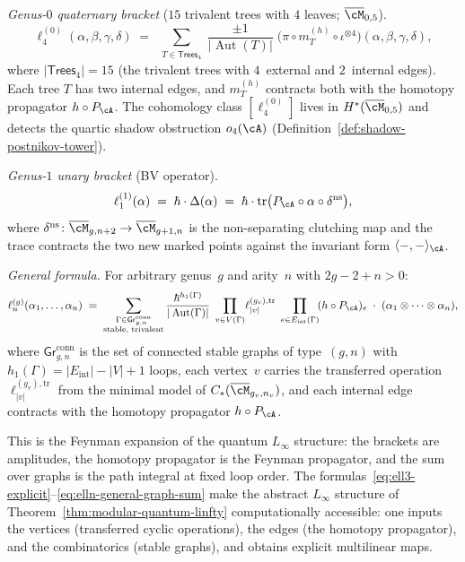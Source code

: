 \begin{construction}
\emph{Genus-$0$ quaternary bracket}
\textup{(}$15$ trivalent trees with $4$ leaves;
$\overline{\cM}_{0,5}$\textup{)}.
\begin{equation}
\label{eq:ell4-explicit}
\ell_4^{(0)}(\alpha,\beta,\gamma,\delta)
\;=\;
\sum_{\substack{T \in \mathsf{Trees}_4}}
\frac{\pm 1}{|\operatorname{Aut}(T)|}
\;\bigl(\pi \circ m_T^{(h)} \circ \iota^{\otimes 4}\bigr)
(\alpha,\beta,\gamma,\delta),
\end{equation}
where $|\mathsf{Trees}_4| = 15$ (the trivalent trees with
$4$~external and $2$~internal edges).  Each tree $T$ has two
internal edges, and $m_T^{(h)}$ contracts both with the homotopy
propagator $h \circ P_{\cA}$.  The cohomology class $[\ell_4^{(0)}]$
lives in $H^*(\overline{\cM}_{0,5})$ and detects the quartic shadow
obstruction $o_4(\cA)$
\textup{(}Definition~\textup{\ref{def:shadow-postnikov-tower})}.

\emph{Genus-$1$ unary bracket} \textup{(}BV operator\textup{)}.
\begin{equation}
\label{eq:ell1-genus1}
\ell_1^{(1)}(\alpha)
\;=\;
\hbar \cdot \Delta(\alpha)
\;=\;
\hbar \cdot \operatorname{tr}\bigl(
P_{\cA} \circ \alpha \circ \delta^{\mathrm{ns}}
\bigr),
\end{equation}
where $\delta^{\mathrm{ns}}\colon
\overline{\cM}_{g,n+2} \to \overline{\cM}_{g+1,n}$ is the
non-separating clutching map and the trace contracts the two
new marked points against the invariant form
$\langle -,- \rangle_{\cA}$.

\emph{General formula.}
For arbitrary genus~$g$ and arity~$n$ with $2g-2+n > 0$:
\begin{equation}
\label{eq:elln-general-graph-sum}
\ell_n^{(g)}(\alpha_1,\ldots,\alpha_n)
\;=\;
\sum_{\substack{
\Gamma \in \mathsf{Gr}^{\mathrm{conn}}_{g,n} \\
\text{stable, trivalent}}}
\frac{\hbar^{h_1(\Gamma)}}{|\operatorname{Aut}(\Gamma)|}
\;\prod_{v \in V(\Gamma)}\!
\ell_{|v|}^{(g_v),\mathrm{tr}}
\;\prod_{e \in E_{\mathrm{int}}(\Gamma)}\!
(h \circ P_{\cA})_e
\;\cdot\;
(\alpha_1 \otimes \cdots \otimes \alpha_n),
\end{equation}
where $\mathsf{Gr}^{\mathrm{conn}}_{g,n}$ is the set of connected
stable graphs of type~$(g,n)$ with
$h_1(\Gamma) = |E_{\mathrm{int}}| - |V| + 1$ loops, each vertex~$v$
carries the transferred operation
$\ell_{|v|}^{(g_v),\mathrm{tr}}$ from the minimal model of
$C_*(\overline{\cM}_{g_v,n_v})$, and each internal edge
contracts with the homotopy propagator $h \circ P_{\cA}$.

This is the Feynman expansion of the quantum $L_\infty$ structure:
the brackets are amplitudes, the homotopy propagator is the Feynman
propagator, and the sum over graphs is the path integral at fixed
loop order.
The formulas~\eqref{eq:ell3-explicit}--\eqref{eq:elln-general-graph-sum}
make the abstract $L_\infty$ structure of
Theorem~\textup{\ref{thm:modular-quantum-linfty}}
computationally accessible: one inputs the vertices (transferred
cyclic operations), the edges (the homotopy propagator), and the
combinatorics (stable graphs), and obtains explicit multilinear
maps.


\end{construction}
